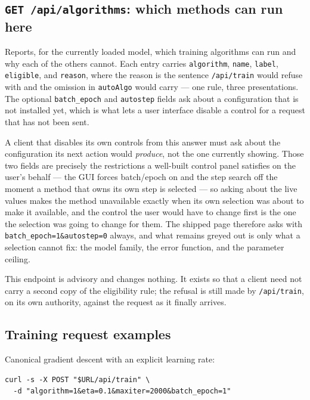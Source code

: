 \subsection{\texttt{GET /api/algorithms}: which methods can run here}

Reports, for the currently loaded model, which training algorithms can run and
why each of the others cannot. Each entry carries \texttt{algorithm},
\texttt{name}, \texttt{label}, \texttt{eligible}, and \texttt{reason}, where the
reason is the sentence \texttt{/api/train} would refuse with and the omission
in \texttt{autoAlgo} would carry --- one rule, three presentations. The optional
\texttt{batch\_epoch} and \texttt{autostep} fields ask about a configuration
that is not installed yet, which is what lets a user interface disable a control
for a request that has not been sent.

A client that disables its own controls from this answer must ask about the
configuration its next action would \emph{produce}, not the one currently
showing. Those two fields are precisely the restrictions a well-built control
panel satisfies on the user's behalf --- the GUI forces batch/epoch on and the
step search off the moment a method that owns its own step is selected --- so
asking about the live values makes the method unavailable exactly when its own
selection was about to make it available, and the control the user would have to
change first is the one the selection was going to change for them. The shipped
page therefore asks with \texttt{batch\_epoch=1\&autostep=0} always, and what
remains greyed out is only what a selection cannot fix: the model family, the
error function, and the parameter ceiling.

This endpoint is advisory and changes nothing. It exists so that a client need
not carry a second copy of the eligibility rule; the refusal is still made by
\texttt{/api/train}, on its own authority, against the request as it finally
arrives.

\subsection{Training request examples}

Canonical gradient descent with an explicit learning rate:
\begin{verbatim}
curl -s -X POST "$URL/api/train" \
  -d "algorithm=1&eta=0.1&maxiter=2000&batch_epoch=1"
\end{verbatim}

